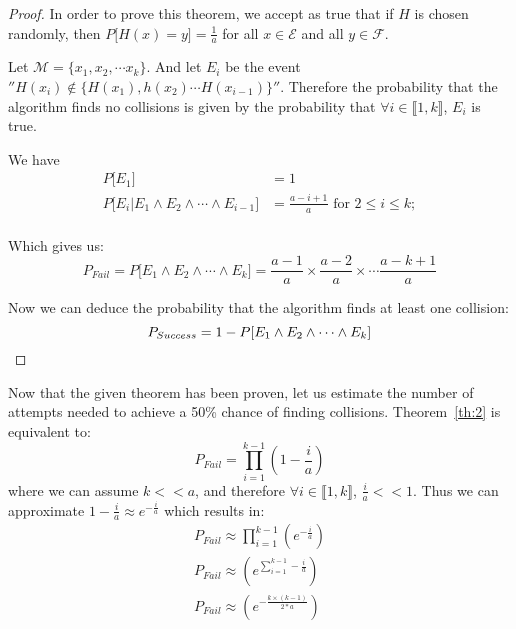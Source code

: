 \begin{proof}
  In order to prove this theorem, we accept as true that if $H$ is chosen randomly, then $P\lbrack H (x) = y \rbrack = \frac{1}{a}$ for all $x \in  \mathcal{E}$ and all $y \in  \mathcal{F}$.

  Let $\mathcal{M} = \{x_1,x_2,\cdots x_k\}$. And let $E_i$ be the event $''H(x_i) \notin \{H(x_1),h(x_2) \cdots H(x_{i-1})\}''$. Therefore the probability that the algorithm finds no collisions is given by the probability that $\forall i \in \llbracket 1,k \rrbracket$, $E_i$ is true. 

  We have
\begin{equation}
\begin{aligned}
  P\lbrack E_1\rbrack & = 1  \\
  P\lbrack E_i \vert E_1 \wedge E_2 \wedge \cdots \wedge E_{i-1}\rbrack & = \frac{a - i + 1}{a}  \mbox{ for } 2 \le i \le k; \\
  \end{aligned}
\end{equation}

Which gives us:
\begin{equation}
    P_{Fail}=P\lbrack E_1 \wedge E_2 \wedge \cdots \wedge E_{k}\rbrack  = \frac{a -  1}{a} \times \frac{a -  2}{a} \times \cdots \frac{a -  k + 1}{a}
 \end{equation}

    Now we can deduce the probability that the algorithm finds at least one collision:
\begin{equation}
 P_{Success}= 1 - P\lbrack E_1 \wedge E_2 \wedge \cdots \wedge E_{k}\rbrack  \\
\end{equation}
\end{proof}

\vspace{.5cm}

Now that the given theorem has been proven, let us estimate the number of attempts needed to achieve a 50\% chance of finding collisions.
Theorem~\ref{th:2} is equivalent to:
\begin{equation}
P_{Fail}= \prod_{i=1}^{k-1}(1-\frac{i}{a})
\end{equation}
where we can assume $k<<a$, and therefore $\forall i \in \llbracket 1,k \rrbracket$, $\frac{i}{a}<<1$.
Thus we can approximate $1-\frac{i}{a} \approx e^{-\frac{i}{a}}$ which results in:
\begin{equation}
  \begin{aligned}
  P_{Fail} \approx \prod_{i=1}^{k-1}(e^{-\frac{i}{a}}) \\
  P_{Fail} \approx (e^{\sum_{i=1}^{k-1}-\frac{i}{a}}) \\
  P_{Fail} \approx (e^{-\frac{k\times (k-1)}{2*a}}) \\
  \end{aligned}
\end{equation}

